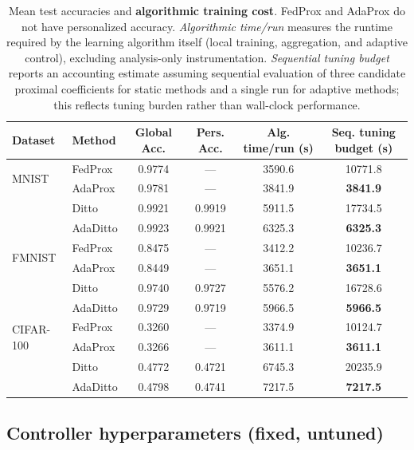 \documentclass[letterpaper]{article} %
\begin{document}
\begin{table}[t]
  \centering
  \small
  \setlength{\tabcolsep}{5pt}
  \begin{tabular}{llcccc}
    \toprule
    Dataset & Method & Global Acc. & Pers. Acc. & Alg. time/run (s) & Seq. tuning budget (s) \\
    \midrule
    \multirow{2}{*}{MNIST}
      & FedProx  & 0.9774 & ---    & 3590.6  & 10771.8 \\
      & AdaProx  & 0.9781 & ---    & 3841.9  & \textbf{3841.9} \\
    \addlinespace
      & Ditto    & 0.9921 & 0.9919 & 5911.5  & 17734.5 \\
      & AdaDitto & 0.9923 & 0.9921 & 6325.3  & \textbf{6325.3} \\
    \midrule
    \multirow{2}{*}{FMNIST}
      & FedProx  & 0.8475 & ---    & 3412.2  & 10236.7 \\
      & AdaProx  & 0.8449 & ---    & 3651.1  & \textbf{3651.1} \\
    \addlinespace
      & Ditto    & 0.9740 & 0.9727 & 5576.2  & 16728.6 \\
      & AdaDitto & 0.9729 & 0.9719 & 5966.5  & \textbf{5966.5} \\
    \midrule
    \multirow{2}{*}{CIFAR-100}
      & FedProx  & 0.3260 & ---    & 3374.9  & 10124.7 \\
      & AdaProx  & 0.3266 & ---    & 3611.1  & \textbf{3611.1} \\
    \addlinespace
      & Ditto    & 0.4772 & 0.4721 & 6745.3  & 20235.9 \\
      & AdaDitto & 0.4798 & 0.4741 & 7217.5  & \textbf{7217.5} \\
    \bottomrule
  \end{tabular}
  \caption{Mean test accuracies and \textbf{algorithmic training cost}. FedProx and AdaProx do not have personalized accuracy.
  \emph{Algorithmic time/run} measures the runtime required by the
  learning algorithm itself (local training, aggregation, and adaptive
  control), excluding analysis-only instrumentation.
  \emph{Sequential tuning budget} reports an accounting estimate
  assuming sequential evaluation of three candidate proximal
  coefficients for static methods and a single run for adaptive
  methods; this reflects tuning burden rather than wall-clock
  performance.}
  \label{tab:overall-acc-alg}
\end{table}



\subsection{Controller hyperparameters (fixed, untuned)}
\end{document}
